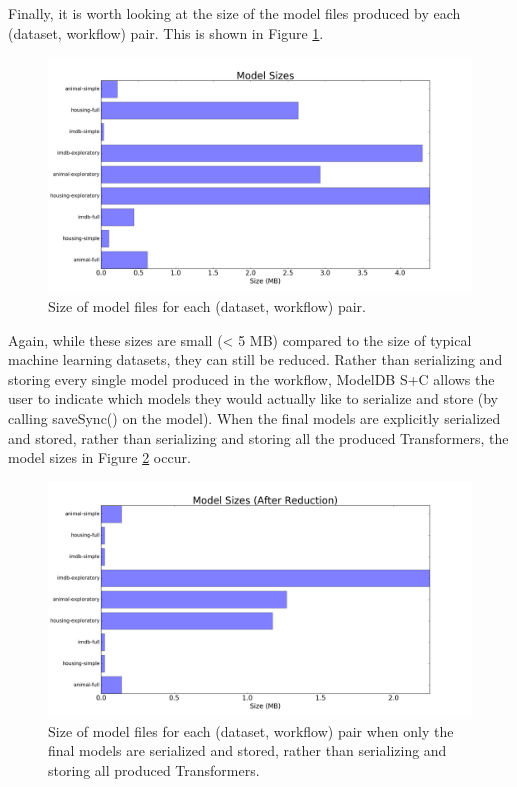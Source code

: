 Finally, it is worth looking at the size of the model files produced by each (dataset, workflow) pair. This is shown in
Figure \ref{fig:modelsizes}.

\begin{figure}
  \centering
  \includegraphics[width=6.0in]{modelsizes}
  \caption{
    Size of model files for each (dataset, workflow) pair.
  }
  \label{fig:modelsizes}
\end{figure}

Again, while these sizes are small (< 5 MB) compared to the size of typical machine learning
datasets, they can still be reduced. Rather than serializing and storing every single model produced in the 
workflow, ModelDB S+C allows the user to indicate which models they would actually like to serialize and store (by
calling saveSync() on the model). When the final models are explicitly serialized and stored, rather than serializing and storing
all the produced Transformers, the model sizes in Figure \ref{fig:modelsizes_small} occur. 

\begin{figure}
  \centering
  \includegraphics[width=6.0in]{modelsizes_small}
  \caption{
    Size of model files for each (dataset, workflow) pair when only the final models are serialized
    and stored, rather than serializing and storing all produced Transformers.
  }
  \label{fig:modelsizes_small}
\end{figure}

